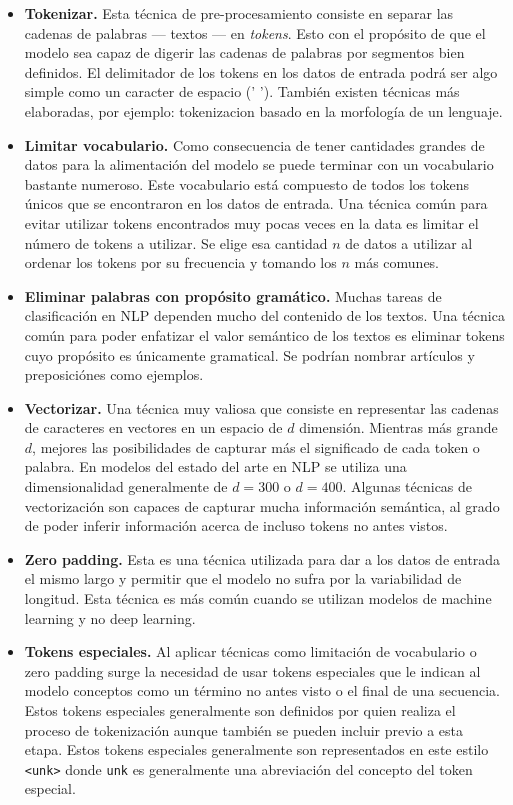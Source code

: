 \begin{itemize}
\item \textbf{Tokenizar.} Esta técnica de pre-procesamiento consiste en separar las cadenas de palabras --- textos --- en \emph{tokens}. Esto con el propósito de que el modelo sea capaz de digerir las cadenas de palabras por segmentos bien definidos. El delimitador de los tokens en los datos de entrada podrá ser algo simple como un caracter de espacio (' '). También existen técnicas más elaboradas, por ejemplo: \gls{tokenizacion} basado en la morfología de un lenguaje.
\item \textbf{Limitar \gls{vocabulario}.} Como consecuencia de tener cantidades grandes de datos para la alimentación del modelo se puede terminar con un vocabulario bastante numeroso. Este vocabulario está compuesto de todos los tokens únicos que se encontraron en los datos de entrada. Una técnica común para evitar utilizar tokens encontrados muy pocas veces en la data es limitar el número de tokens a utilizar. Se elige esa cantidad $n$ de datos a utilizar al ordenar los tokens por su frecuencia y tomando los $n$ más comunes.
\item \textbf{Eliminar palabras con propósito gramático.} Muchas tareas de clasificación en NLP dependen mucho del contenido de los textos. Una técnica común para poder enfatizar el valor semántico de los textos es eliminar tokens cuyo propósito es únicamente gramatical. Se podrían nombrar artículos y preposiciónes como ejemplos.
\item \textbf{Vectorizar.} Una técnica muy valiosa que consiste en representar las cadenas de caracteres en vectores en un espacio de $d$ dimensión. Mientras más grande $d$, mejores las posibilidades de capturar más el significado de cada token o palabra. En modelos del estado del arte en NLP se utiliza una dimensionalidad generalmente de $d = 300$ o $d = 400$. Algunas técnicas de vectorización son capaces de capturar mucha información semántica, al grado de poder inferir información acerca de incluso tokens no antes vistos.
\item \textbf{Zero padding.} Esta es una técnica utilizada para dar a los datos de entrada el mismo largo y permitir que el modelo no sufra por la variabilidad de longitud. Esta técnica es más común cuando se utilizan modelos de machine learning y no deep learning.
\item \textbf{Tokens especiales.} Al aplicar técnicas como limitación de vocabulario o zero padding surge la necesidad de usar tokens especiales que le indican al modelo conceptos como un término no antes visto o el final de una secuencia. Estos tokens especiales generalmente son definidos por quien realiza el proceso de tokenización aunque también se pueden incluir previo a esta etapa. Estos tokens especiales generalmente son representados en este estilo \texttt{<unk>} donde \texttt{unk} es generalmente una abreviación del concepto del token especial. 
\end{itemize}

